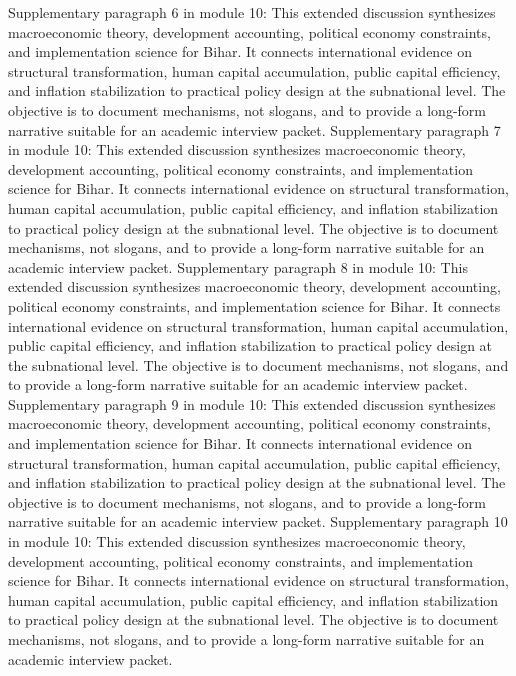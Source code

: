 \documentclass[preprint,12pt]{elsarticle}
\begin{document}
Supplementary paragraph 6 in module 10: This extended discussion synthesizes macroeconomic theory, development accounting, political economy constraints, and implementation science for Bihar. It connects international evidence on structural transformation, human capital accumulation, public capital efficiency, and inflation stabilization to practical policy design at the subnational level. The objective is to document mechanisms, not slogans, and to provide a long-form narrative suitable for an academic interview packet.
Supplementary paragraph 7 in module 10: This extended discussion synthesizes macroeconomic theory, development accounting, political economy constraints, and implementation science for Bihar. It connects international evidence on structural transformation, human capital accumulation, public capital efficiency, and inflation stabilization to practical policy design at the subnational level. The objective is to document mechanisms, not slogans, and to provide a long-form narrative suitable for an academic interview packet.
Supplementary paragraph 8 in module 10: This extended discussion synthesizes macroeconomic theory, development accounting, political economy constraints, and implementation science for Bihar. It connects international evidence on structural transformation, human capital accumulation, public capital efficiency, and inflation stabilization to practical policy design at the subnational level. The objective is to document mechanisms, not slogans, and to provide a long-form narrative suitable for an academic interview packet.
Supplementary paragraph 9 in module 10: This extended discussion synthesizes macroeconomic theory, development accounting, political economy constraints, and implementation science for Bihar. It connects international evidence on structural transformation, human capital accumulation, public capital efficiency, and inflation stabilization to practical policy design at the subnational level. The objective is to document mechanisms, not slogans, and to provide a long-form narrative suitable for an academic interview packet.
Supplementary paragraph 10 in module 10: This extended discussion synthesizes macroeconomic theory, development accounting, political economy constraints, and implementation science for Bihar. It connects international evidence on structural transformation, human capital accumulation, public capital efficiency, and inflation stabilization to practical policy design at the subnational level. The objective is to document mechanisms, not slogans, and to provide a long-form narrative suitable for an academic interview packet.
\end{document}
